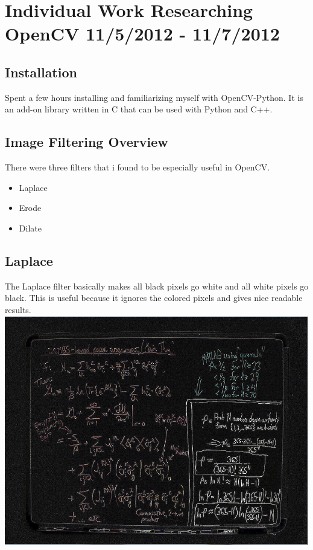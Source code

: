\documentclass[]{article}
\begin{document}
	\section{Individual Work Researching OpenCV 11/5/2012 - 11/7/2012}
		\subsection{Installation}
			Spent a few hours installing and familiarizing myself with OpenCV-Python. It is an add-on library written in C that can be used with Python and C++.
		\subsection{Image Filtering Overview}
		There were three filters that i found to be especially useful in OpenCV.
			\begin{itemize}
				\item Laplace
				\item Erode
				\item Dilate
			\end{itemize}
		\subsection{Laplace}

			The Laplace filter basically makes all black pixels go white and all white pixels go black. This is useful because it ignores the colored pixels and gives nice readable results. \\

			\includegraphics{images/laplaceSmall.png} \\
		
\end{document}
